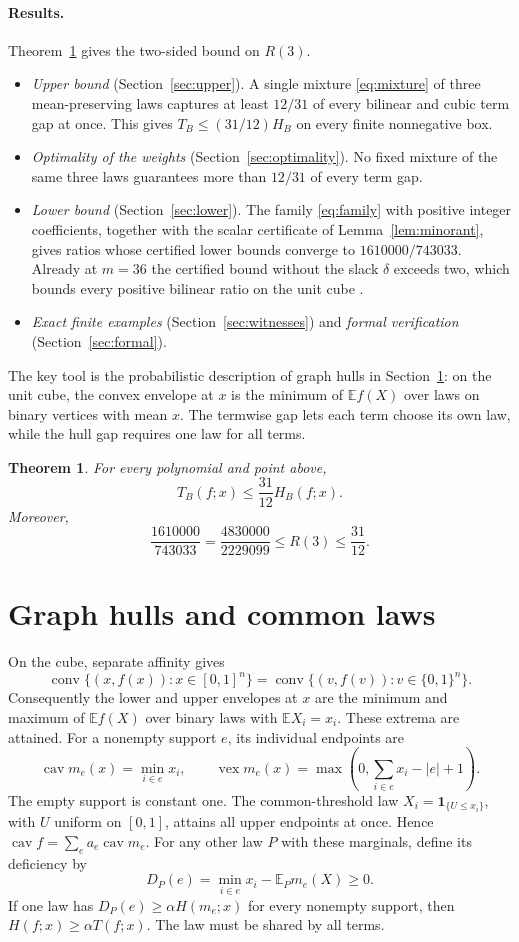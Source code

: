 \documentclass[11pt]{article}
\newtheorem{theorem}{Theorem}
\theoremstyle{remark}
\DeclareMathOperator{\vex}{vex}
\DeclareMathOperator{\cav}{cav}
\DeclareMathOperator{\conv}{conv}
\newcommand{\E}{\mathbb E}
\newcommand{\ind}{\mathbf 1}
\begin{document}
\paragraph{Results.}
Theorem~\ref{thm:main} gives the two-sided bound on $R(3)$.
\begin{itemize}
\item \emph{Upper bound} (Section~\ref{sec:upper}). A single mixture
 \eqref{eq:mixture} of three mean-preserving laws captures at least
 $12/31$ of every bilinear and cubic term gap at once. This gives
 $T_B\le(31/12)H_B$ on every finite nonnegative box.
\item \emph{Optimality of the weights} (Section~\ref{sec:optimality}).
 No fixed mixture of the same three laws guarantees more than $12/31$
 of every term gap.
\item \emph{Lower bound} (Section~\ref{sec:lower}). The family
 \eqref{eq:family} with positive integer coefficients, together with the
 scalar certificate of Lemma~\ref{lem:minorant}, gives ratios whose
 certified lower bounds converge to $1610000/743033$. Already at $m=36$
 the certified bound without the slack $\delta$ exceeds two, which
 bounds every positive bilinear ratio on the unit cube
 \citep{Luedtke2012}.
\item \emph{Exact finite examples} (Section~\ref{sec:witnesses}) and
 \emph{formal verification} (Section~\ref{sec:formal}).
\end{itemize}
The key tool is the probabilistic description of graph hulls in
Section~\ref{sec:hulls}: on the unit cube, the convex envelope at $x$ is
the minimum of $\E f(X)$ over laws on binary vertices with mean $x$. The
termwise gap lets each term choose its own law, while the hull gap
requires one law for all terms.

\begin{theorem}\label{thm:main}
For every polynomial and point above,
\[
 T_B(f;x)\le\frac{31}{12}H_B(f;x).
\]
Moreover,
\[
 \frac{1610000}{743033}
 =\frac{4830000}{2229099}
 \le R(3)\le\frac{31}{12}.
\]
\end{theorem}

\section{Graph hulls and common laws}\label{sec:hulls}
On the cube, separate affinity gives
\[
 \conv\{(x,f(x)):x\in[0,1]^n\}
 =\conv\{(v,f(v)):v\in\{0,1\}^n\}.
\]
Consequently the lower and upper envelopes at $x$ are the minimum and
maximum of $\E f(X)$ over binary laws with $\E X_i=x_i$. These extrema
are attained. For a nonempty support $e$, its individual endpoints are
\[
 \cav m_e(x)=\min_{i\in e}x_i,
 \qquad
 \vex m_e(x)=\max\left(0,\sum_{i\in e}x_i-|e|+1\right).
\]
The empty support is constant one. The common-threshold law
$X_i=\ind_{\{U\le x_i\}}$, with $U$ uniform on $[0,1]$, attains all
upper endpoints at once. Hence $\cav f=\sum_e a_e\cav m_e$.
For any other law $P$ with these marginals, define its deficiency by
\[
 D_P(e)=\min_{i\in e}x_i-\E_Pm_e(X)\ge0.
\]
If one law has $D_P(e)\ge\alpha H(m_e;x)$ for every nonempty support,
then $H(f;x)\ge\alpha T(f;x)$. The law must be shared by all terms.
\end{document}
